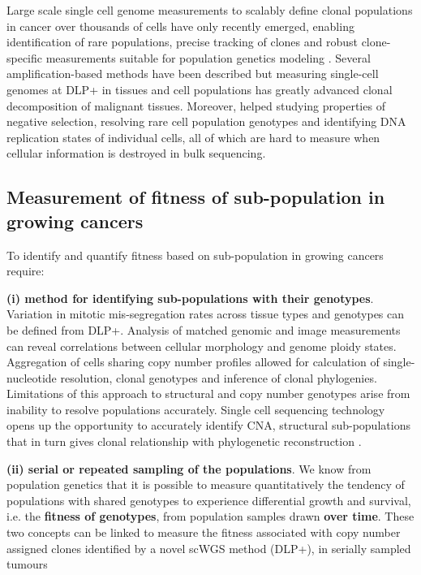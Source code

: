Large scale single cell genome measurements to scalably define clonal populations in  cancer  over  thousands  of  cells  have  only  recently  emerged,  enabling  identification  of rare populations, precise tracking of clones and robust clone-specific measurements suitable for population genetics modeling  \cite{laks2019clonal,zahn2017scalable}. Several amplification-based methods have been described \cite{navin2011tumour,zong2012genome, hou2012single,ni2013reproducible} but measuring single-cell genomes at \ac{DLP+} in tissues and cell populations has greatly advanced clonal decomposition of malignant tissues. Moreover, helped studying properties of negative selection, resolving rare cell population genotypes and identifying DNA replication states of individual cells, all of which are hard to measure when cellular information is destroyed in bulk sequencing. 


\subsection{Measurement of fitness of sub-population in growing cancers}
To identify and quantify fitness based on sub-population in growing cancers require: 

\textbf{(i) method for identifying sub-populations with their genotypes}.
Variation in mitotic mis-segregation rates across tissue types and genotypes can be defined from DLP+. Analysis of matched genomic and image measurements can reveal correlations between cellular morphology and genome ploidy states. Aggregation of cells sharing copy number profiles allowed for calculation of single-nucleotide resolution, clonal genotypes and inference of clonal phylogenies.
Limitations of this approach to structural and copy number genotypes arise from inability to resolve populations accurately. Single cell sequencing technology opens up the opportunity to accurately identify CNA, structural sub-populations that in turn gives clonal relationship with phylogenetic reconstruction \cite{satas2020scarlet, dorri2020efficient}.

\textbf{(ii) serial or repeated sampling of the populations}.
We know from population genetics that it is possible to measure quantitatively the tendency of populations with shared genotypes to experience differential growth and survival, i.e. the \textbf{fitness of genotypes}, from population samples drawn \textbf{over time}.
These two concepts can be linked to measure the fitness associated with copy number assigned clones identified by a novel scWGS method (DLP+), in serially sampled tumours

